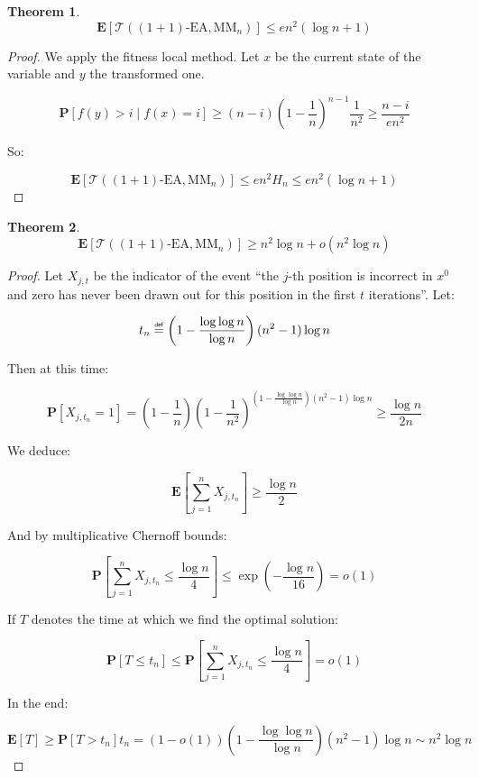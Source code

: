 \documentclass[12pt]{article}
\theoremstyle{definition}
\theoremstyle{plain}
\newtheorem*{theorem}{Theorem}
\theoremstyle{remark}
\newcommand\mydef{\mathrel{\overset{\makebox[0pt]{\mbox{\normalfont\tiny\sffamily def}}}{=}}}
\begin{document}
\begin{theorem}
    $$\mathbf{E}[\mathcal{T}((1+1)\text{-EA},\text{MM}_n)]\le e n^2 (\log n+1)$$
\end{theorem}

\begin{proof}
    We apply the fitness local method. Let $x$ be the current state of the variable and $y$ the transformed one. 

    $$\mathbf{P}[f(y)>i\mid f(x)=i]\ge (n-i)\left(1-\frac{1}{n}\right)^{n-1} \frac{1}{n^2}\ge \frac{n-i}{e n^2}$$

    So:

    $$\mathbf{E}[\mathcal{T}((1+1)\text{-EA},\text{MM}_n)]\le e n^2 H_n\le e n^2(\log n+1)$$\qedhere
\end{proof}

\begin{theorem}
    $$\mathbf{E}[\mathcal{T}((1+1)\text{-EA},\text{MM}_n)]\ge n^2 \log n+o(n^2\log n)$$
\end{theorem}

\begin{proof}
    Let $X_{j,t}$ be the indicator of the event ``the $j$-th position is incorrect in $x^0$ and zero has
    never been drawn out for this position in the first $t$ iterations''. Let:

    $$t_n\mydef \left(1-\frac{\log \log n}{\log n}\right)(n^2-1)\log n$$

    Then at this time:

    $$\mathbf{P}[X_{j,t_n}=1]=
    \left(1-\frac{1}{n}\right)\left(1-\frac{1}{n^2}\right)^{\left(1-\frac{\log\log n}{\log n}\right)(n^2-1)\log n}\ge \frac{\log n}{2n}
    $$

    We deduce:

    $$\mathbf{E}\left[\sum_{j=1}^n X_{j,t_n}\right] \ge \frac{\log n}{2}$$

    And by multiplicative Chernoff bounds:

    $$\mathbf{P}\left[\sum_{j=1}^n X_{j,t_n}\le \frac{\log n}{4}\right] \le \exp\left(-\frac{\log n}{16}\right)=o(1)$$

    If $T$ denotes the time at which we find the optimal solution:

    $$\mathbf{P}[T\le t_n]\le \mathbf{P}\left[\sum_{j=1}^n X_{j,t_n} \le \frac{\log n}{4}\right]=o(1)$$

    In the end:

    $$\mathbf{E}[T]\ge \mathbf{P}[T>t_n] t_n=(1-o(1))\left(1-\frac{\log \log n}{\log n}\right)(n^2-1)\log n\sim n^2\log n$$\qedhere
\end{proof}
\end{document}
